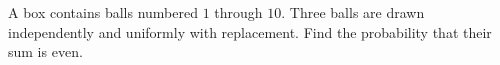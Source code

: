 A box contains balls numbered $1$ through $10$. Three balls are drawn independently and uniformly with replacement. Find the probability that their sum is even.
